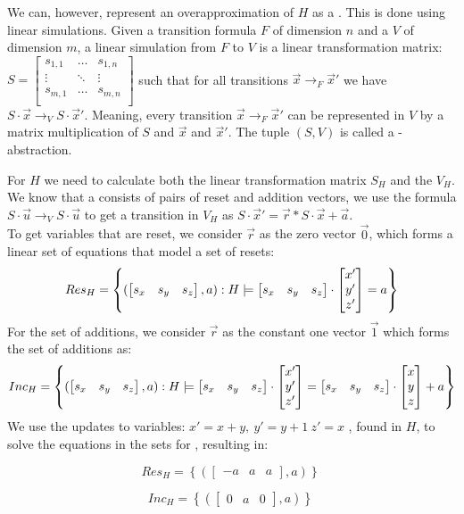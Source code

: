 We can, however, represent an overapproximation of $H$ as a \qvasr. This is done using linear simulations. Given a transition formula $F$ of dimension $n$ and a \qvasr $V$ of dimension $m$, a linear simulation from $F$ to $V$ is a linear transformation matrix: 
$S = 
\begin{bmatrix}
	s_{1 ,1} & \ldots & s_{1, n} \\
	\vdots & \ddots & \vdots \\
	s_{m ,1} & \ldots & s_{m, n} \\
\end{bmatrix}$ 
such that for all transitions $\vec{x} \rightarrow_F \vec{x}'$ we have $S\cdot\vec{x} \rightarrow_V S\cdot\vec{x}'$. Meaning, every transition $\vec{x} \rightarrow_F \vec{x}'$ can be represented in $V$ by a matrix multiplication of $S$ and $\vec{x}$ and $\vec{x}'$. The tuple $(S, V)$ is called a \qvasr-abstraction. \par For $H$ we need to calculate both the linear transformation matrix $S_H$ and the \qvasr $V_H$. We know that a \qvasr consists of pairs of reset and addition vectors, we use the formula $S \cdot \vec{u} \rightarrow_V S \cdot \vec{u}$ to get a transition in $V_H$ as $S\cdot\vec{x}' = \vec{r}*S\cdot\vec{x} + \vec{a}$. \\ To get variables that are reset, we consider $\vec{r}$ as the zero vector $\vec{0}$, which forms a linear set of equations that model a set of resets:
\begin{equation*}
	Res_H = \left\{ (\begin{bmatrix} s_x & s_y & s_z \end{bmatrix}, a) : H \models \begin{bmatrix} s_x & s_y & s_z \end{bmatrix} \cdot \begin{bmatrix} x' \\ y' \\ z' \end{bmatrix} = a \right\}	
\end{equation*}
For the set of additions, we consider $\vec{r}$ as the constant one vector $\vec{1}$ which forms the set of additions as:
\begin{equation*}
	Inc_H = \left\{(\begin{bmatrix} s_x & s_y & s_z \end{bmatrix}, a) : H \models \begin{bmatrix} s_x & s_y & s_z \end{bmatrix} \cdot \begin{bmatrix} x' \\ y' \\ z' \end{bmatrix} = \begin{bmatrix} s_x & s_y & s_z \end{bmatrix} \cdot \begin{bmatrix} x \\ y \\ z \end{bmatrix} + a\right\}	
\end{equation*}
We use the updates to variables: $x' = x + y, \ y'= y + 1\ z' = x$ , found in $H$, to solve the equations in the sets for \s, resulting in: 
\vspace*{-0.5em}
\begin{center}
	\begin{minipage}{0.5\linewidth}
		\begin{equation*}
			Res_H = \left\{ (\begin{bmatrix} -a & a & a \end{bmatrix}, a) \right\}\
		\end{equation*}
	\end{minipage}
	\begin{minipage}{0.4\linewidth}
		\begin{equation*}
			Inc_H = \left\{ (\begin{bmatrix} 0 & a & 0 \end{bmatrix}, a) \right\}\ 
		\end{equation*}
	\end{minipage}
\end{center}

